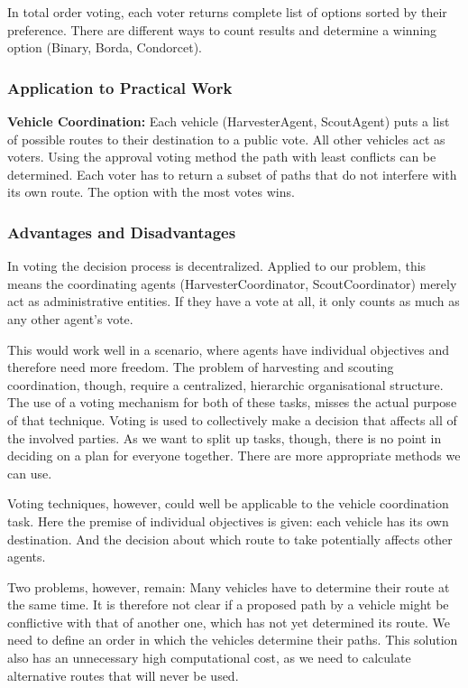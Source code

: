 In total order voting, each voter returns complete list of options sorted by their preference. There are different ways to count results and determine a winning option (Binary, Borda, Condorcet).


\subsubsection{Application to Practical Work}

\textbf{Vehicle Coordination:} Each vehicle (HarvesterAgent, ScoutAgent) puts a list of possible routes to their destination to a public vote. All other vehicles act as voters. Using the approval voting method the path with least conflicts can be determined. Each voter has to return a subset of paths that do not interfere with its own route. The option with the most votes wins.

\subsubsection{Advantages and Disadvantages}

In voting the decision process is decentralized. Applied to our problem, this means the coordinating agents (HarvesterCoordinator, ScoutCoordinator) merely act as administrative entities. If they have a vote at all, it only counts as much as any other agent's vote. 

This would work well in a scenario, where agents have individual objectives and therefore need more freedom. The problem of harvesting and scouting coordination, though, require a centralized, hierarchic organisational structure. The use of a voting mechanism for both of these tasks, misses the actual purpose of that technique. Voting is used to collectively make a decision that affects all of the involved parties. As we want to split up tasks, though, there is no point in deciding on a plan for everyone together. There are more appropriate methods we can use.

Voting techniques, however, could well be applicable to the vehicle coordination task. Here the premise of individual objectives is given: each vehicle has its own destination. And the decision about which route to take potentially affects other agents. 

Two problems, however, remain: Many vehicles have to determine their route at the same time. It is therefore not clear if a proposed path by a vehicle might be conflictive with that of another one, which has not yet determined its route. We need to define an order in which the vehicles determine their paths. This solution also has an unnecessary high computational cost, as we need to calculate alternative routes that will never be used.



